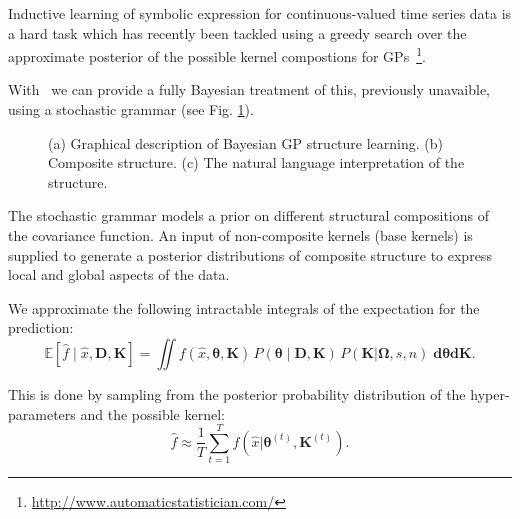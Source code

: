 Inductive learning of symbolic expression for continuous-valued time series
data is a hard task which has recently been tackled using a greedy search over 
the approximate posterior of the possible kernel compostions for
\ac{GP}s~\citep{duvenaud2013structure,lloyd2014automatic}\footnote{\url{http://www.automaticstatistician.com/}}.

With \gpmem\ we can provide a fully Bayesian treatment of this, previously unavaible,
using a stochastic grammar  (see Fig. \ref{fig:schema}).

\begin{figure}
\centering

\caption{(a) Graphical description of Bayesian GP structure learning. (b) Composite structure. (c) The natural language interpretation of the structure.}\label{fig:schema}
\end{figure}

The stochastic grammar models a prior on different structural compositions of the covariance function. An input of non-composite kernels (base kernels) is supplied to generate a posterior distributions of composite structure to express local and global aspects of the data.


We approximate the following intractable integrals of the expectation for the prediction:
\begin{equation}
\mathbb{E}[\hat{f} \mid \hat{x},\mathbf{D},\mathbf{K}] =\iint f(\hat{x},\bm{\theta},\mathbf{K})\,P(\bm{\theta} \mid \mathbf{D,\mathbf{K}})\,P(\mathbf{K}|\bm{\Omega},s,n) \; \mathbf{d} \bm{\theta} \mathbf{d} \mathbf{K}.  
\end{equation}

This is done by sampling from the posterior probability distribution of the hyper-parameters and the possible kernel:
\begin{equation}
\hat{f} \approx \frac{1}{T} \sum^T_{t=1} f(\hat{x} | \bm{\theta}^{(t)},\mathbf{K}^{(t)}). 
\end{equation}



